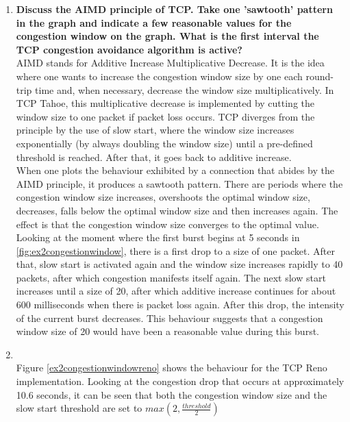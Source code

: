 \documentclass[a4paper,10pt]{article}
\begin{document}
\begin{enumerate}
 \item \textbf{Discuss the AIMD principle of TCP. Take one 'sawtooth' pattern in the graph and indicate a few
 reasonable values for the congestion window on the graph. What is the first interval the TCP congestion avoidance
 algorithm is active?} \\
 
 AIMD stands for Additive Increase Multiplicative Decrease. It is the idea where one wants to increase the congestion window
 size by one each round-trip time and, when necessary, decrease the window size multiplicatively. In TCP Tahoe, this
 multiplicative decrease is implemented by cutting the window size to one packet if packet loss occurs. TCP diverges
 from the principle by the use of slow start, where the window size increases exponentially (by always doubling the
 window size) until a pre-defined threshold is reached. After that, it goes back to additive increase. \\
 
 When one plots the behaviour exhibited by a connection that abides by the AIMD principle, it produces a sawtooth pattern.
 There are periods where the congestion window size increases, overshoots the optimal window size, decreases, falls
 below the optimal window size and then increases again. The effect is that the congestion window size converges
 to the optimal value. Looking at the moment where the first burst begins at 5 seconds in \ref{fig:ex2congestionwindow},
 there is a first drop to a size of one packet. After that, slow start is activated again and the window size increases
 rapidly to 40 packets, after which congestion manifests itself again. The next slow start increases until a size of 20,
 after which additive increase continues for about 600 milliseconds when there is packet loss again. After this drop,
 the intensity of the current burst decreases. This behaviour suggests that a congestion window size of 20 would have been
 a reasonable value during this burst.
 
 \item {} \\
 
 Figure \ref{ex2congestionwindowreno} shows the behaviour for the TCP Reno implementation. Looking at the congestion drop
 that occurs at approximately 10.6 seconds, it can be seen that both the congestion window size and the slow start threshold
 are set to $max(2, \frac{threshold}{2})$
 

\end{enumerate}
\end{document}

